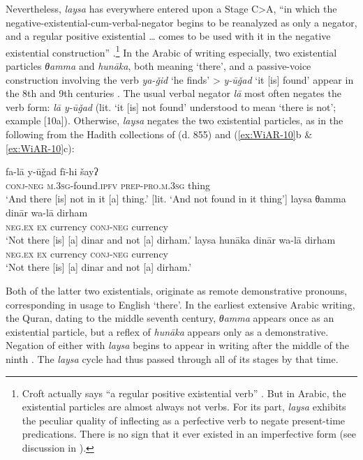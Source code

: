 \documentclass[output=paper,colorlinks,citecolor=brown]{langscibook}
\begin{document}
Nevertheless, \textit{laysa} has everywhere entered upon a Stage C>A, “in which the negative-existential-cum-verbal-negator begins to be reanalyzed as only a negator, and a regular positive existential … comes to be used with it in the negative existential construction” \citep[12]{Croft1991}.\footnote{Croft actually says “a regular positive existential verb” \citep[12]{Croft1991}. But in Arabic, the existential particles are almost always not verbs. For its part, \textit{laysa} exhibits the peculiar quality of inflecting as a perfective verb to negate present-time predications. There is no sign that it ever existed in an imperfective form (see discussion in \citealt[341--346]{wilmsen2016a}).} In the Arabic of writing especially, two existential particles \textit{θamma} and \textit{hunāka}, both meaning ‘there’, and a passive-voice construction involving the verb \textit{ya-ǧid} ‘he finds’ > \textit{y-ūǧad} ‘it [is] found’ appear in the 8th and 9th centuries \citep[354–356]{wilmsen2016a}. The usual verbal negator \textit{lā} most often negates the verb form: \textit{lā y-ūǧad} (lit. ‘it [is] not found’ understood to mean ‘there is not’; example [10a]). Otherwise, \textit{laysa} negates the two existential particles, as in the following from the Hadith collections of \citeauthor{anbal-a} (d. 855) and \citeauthor{al-bu2000a} (\ref{ex:WiAR-10}b \& \ref{ex:WiAR-10}c):

\ea \label{ex:WiAR-10}
  \ea
  	\gll fa-lā y-ūǧad fī-hi šayʔ\\
  	\textsc{conj-neg} \textsc{m.3sg}-found.\textsc{ipfv}	\textsc{prep-pro.m.3sg} thing\\
  	\glt ‘And there [is] not in it [a] thing.’ [lit. ‘And not found in it thing’] \citep[Vol. VIII p. 1256]{al-bu2000a}
  \ex
  	\gll laysa θamma dinār wa-lā dirham \\
  	\textsc{neg.ex} \textsc{ex} currency \textsc{conj-neg} currency \\
    \glt ‘Not there [is] [a] dinar and not [a] dirham.' \citep[Vol. VIII p. 1323]{al-bu2000a}
  \ex
  	\gll laysa hunāka dinār wa-lā dirham \\
  	\textsc{neg.ex} \textsc{ex} currency \textsc{conj-neg} currency\\
  	\glt ‘Not there [is] [a] dinar and not [a] dirham.’ \citep[Vol. IX, p. 507]{anbal-a}
\z \z

Both of the latter two existentials, originate as remote demonstrative pronouns, corresponding in usage to English ‘there’. In the earliest extensive Arabic writing, the Quran, dating to the middle seventh century, \textit{θamma} appears once as an existential particle, but a reflex of \textit{hunāka} appears only as a demonstrative. Negation of either with \textit{laysa} begins to appear in writing after the middle of the ninth \citep[354--355]{wilmsen2016a}. The \textit{laysa} cycle had thus passed through all of its stages by that time.
\end{document}
